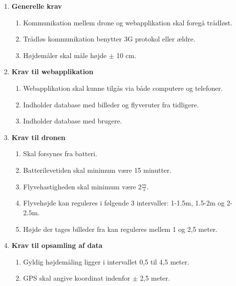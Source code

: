 \begin{enumerate}
\item \textbf{Generelle krav}
	\begin{enumerate}[label*=\arabic*.]
	\item Kommunikation mellem drone og webapplikation skal foregå trådløst.
	\item Trådløs kommunikation benytter 3G protokol eller ældre. 
	\item Højdemåler skal måle højde $\pm$ 10 cm.\\
	\end{enumerate}

\item \textbf{Krav til webapplikation}
	\begin{enumerate}[label*=\arabic*.]
	\item Webapplikation skal kunne tilgås via både computere og telefoner.
	\item Indholder database med billeder og flyveruter fra tidligere.
	\item Indholder database med brugere.\\
	\end{enumerate}	
	

\item \textbf{Krav til dronen}
	\begin{enumerate}[label*=\arabic*.]
	\item Skal forsynes fra batteri.
	\item Batterilevetiden skal minimum være 15 minutter.
	\item Flyvehastigheden skal minimum være 2$\frac{m}{s}$.
	\item Flyvehøjde kan reguleres i følgende 3 intervaller: 1-1.5m, 1.5-2m og 2-2.5m.
	\item Højde der tages billeder fra kan reguleres mellem 1 og 2,5 meter.\\
	
	\end{enumerate}
	
\item \textbf{Krav til opsamling af data}
	\begin{enumerate} [label*=\arabic*.]
	\item Gyldig højdemåling ligger i intervallet 0,5 til 4,5 meter. 
	\item GPS skal angive koordinat indenfor $\pm$ 2,5 meter.
	\end{enumerate}
\end{enumerate}